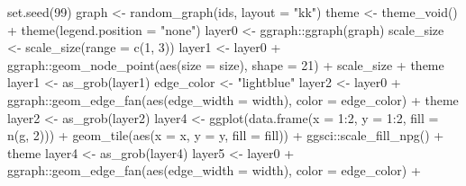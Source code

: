 \documentclass[
]{article}
\newenvironment{Shaded}{\begin{snugshade}}{\end{snugshade}}
\newcommand{\AttributeTok}[1]{\textcolor[rgb]{0.77,0.63,0.00}{#1}}
\newcommand{\DecValTok}[1]{\textcolor[rgb]{0.00,0.00,0.81}{#1}}
\newcommand{\FunctionTok}[1]{\textcolor[rgb]{0.00,0.00,0.00}{#1}}
\newcommand{\NormalTok}[1]{#1}
\newcommand{\OtherTok}[1]{\textcolor[rgb]{0.56,0.35,0.01}{#1}}
\newcommand{\SpecialCharTok}[1]{\textcolor[rgb]{0.00,0.00,0.00}{#1}}
\newcommand{\StringTok}[1]{\textcolor[rgb]{0.31,0.60,0.02}{#1}}
\begin{document}
\begin{Shaded}
\begin{Highlighting}[]
\FunctionTok{set.seed}\NormalTok{(}\DecValTok{99}\NormalTok{)}
\NormalTok{graph }\OtherTok{\textless{}{-}} \FunctionTok{random\_graph}\NormalTok{(ids, }\AttributeTok{layout =} \StringTok{"kk"}\NormalTok{)}
\NormalTok{theme }\OtherTok{\textless{}{-}} \FunctionTok{theme\_void}\NormalTok{() }\SpecialCharTok{+} \FunctionTok{theme}\NormalTok{(}\AttributeTok{legend.position =} \StringTok{"none"}\NormalTok{)}
\NormalTok{layer0 }\OtherTok{\textless{}{-}}\NormalTok{ ggraph}\SpecialCharTok{::}\FunctionTok{ggraph}\NormalTok{(graph)}
\NormalTok{scale\_size }\OtherTok{\textless{}{-}} \FunctionTok{scale\_size}\NormalTok{(}\AttributeTok{range =} \FunctionTok{c}\NormalTok{(}\DecValTok{1}\NormalTok{, }\DecValTok{3}\NormalTok{))}
\NormalTok{layer1 }\OtherTok{\textless{}{-}}\NormalTok{ layer0 }\SpecialCharTok{+}\NormalTok{ ggraph}\SpecialCharTok{::}\FunctionTok{geom\_node\_point}\NormalTok{(}\FunctionTok{aes}\NormalTok{(}\AttributeTok{size =}\NormalTok{ size), }\AttributeTok{shape =} \DecValTok{21}\NormalTok{) }\SpecialCharTok{+}
\NormalTok{  scale\_size }\SpecialCharTok{+}\NormalTok{ theme}
\NormalTok{layer1 }\OtherTok{\textless{}{-}} \FunctionTok{as\_grob}\NormalTok{(layer1)}
\NormalTok{edge\_color }\OtherTok{\textless{}{-}} \StringTok{"lightblue"}
\NormalTok{layer2 }\OtherTok{\textless{}{-}}\NormalTok{ layer0 }\SpecialCharTok{+}
\NormalTok{  ggraph}\SpecialCharTok{::}\FunctionTok{geom\_edge\_fan}\NormalTok{(}\FunctionTok{aes}\NormalTok{(}\AttributeTok{edge\_width =}\NormalTok{ width), }\AttributeTok{color =}\NormalTok{ edge\_color) }\SpecialCharTok{+}\NormalTok{ theme}
\NormalTok{layer2 }\OtherTok{\textless{}{-}} \FunctionTok{as\_grob}\NormalTok{(layer2)}
\NormalTok{layer4 }\OtherTok{\textless{}{-}} \FunctionTok{ggplot}\NormalTok{(}\FunctionTok{data.frame}\NormalTok{(}\AttributeTok{x =} \DecValTok{1}\SpecialCharTok{:}\DecValTok{2}\NormalTok{, }\AttributeTok{y =} \DecValTok{1}\SpecialCharTok{:}\DecValTok{2}\NormalTok{, }\AttributeTok{fill =} \FunctionTok{n}\NormalTok{(g, }\DecValTok{2}\NormalTok{))) }\SpecialCharTok{+} 
  \FunctionTok{geom\_tile}\NormalTok{(}\FunctionTok{aes}\NormalTok{(}\AttributeTok{x =}\NormalTok{ x, }\AttributeTok{y =}\NormalTok{ y, }\AttributeTok{fill =}\NormalTok{ fill)) }\SpecialCharTok{+} 
\NormalTok{  ggsci}\SpecialCharTok{::}\FunctionTok{scale\_fill\_npg}\NormalTok{() }\SpecialCharTok{+}\NormalTok{ theme}
\NormalTok{layer4 }\OtherTok{\textless{}{-}} \FunctionTok{as\_grob}\NormalTok{(layer4)}
\NormalTok{layer5 }\OtherTok{\textless{}{-}}\NormalTok{ layer0 }\SpecialCharTok{+} 
\NormalTok{  ggraph}\SpecialCharTok{::}\FunctionTok{geom\_edge\_fan}\NormalTok{(}\FunctionTok{aes}\NormalTok{(}\AttributeTok{edge\_width =}\NormalTok{ width), }\AttributeTok{color =}\NormalTok{ edge\_color) }\SpecialCharTok{+}

\end{Highlighting}
\end{Shaded}
\end{document}
